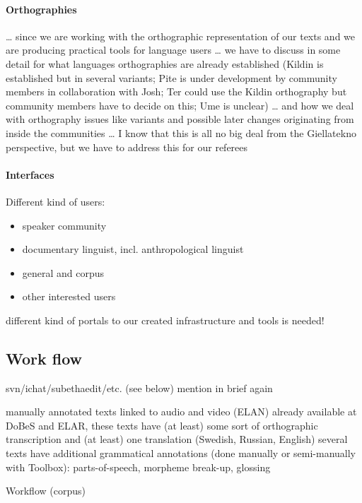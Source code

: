 \documentclass[a4paper,12pt]{article}
\begin{document}
\paragraph{Orthographies}
… since we are working with the orthographic representation of our texts and we are producing practical tools for language users … we have to discuss in some detail for what languages orthographies are already established (Kildin is established but in several variants; Pite is under development by community members in collaboration with Josh; Ter could use the Kildin orthography but community members have to decide on this; Ume is unclear) … and how we deal with orthography issues like variants and possible later changes originating from inside the communities … I know that this is all no big deal from the Giellatekno perspective, but we have to address this for our referees 

\paragraph{Interfaces}
Different kind of users:
\begin{itemize}
\item speaker community
\item documentary linguist, incl. anthropological linguist
\item general and corpus
\item other interested users
\end{itemize}

different kind of portals to our created infrastructure and tools is needed!


\subsection{Work flow}%
svn/ichat/subethaedit/etc. (see below) mention in brief again

manually annotated texts linked to audio and video (ELAN) already available at DoBeS and ELAR, these texts have (at least) some sort of orthographic transcription and (at least) one translation (Swedish, Russian, English)
several texts have additional grammatical annotations (done manually or semi-manually with Toolbox): parts-of-speech, morpheme break-up, glossing

Workflow (corpus)
\end{document}
